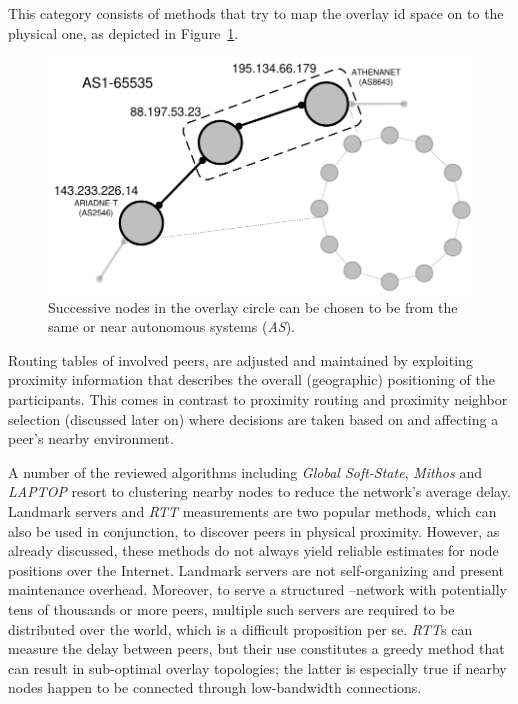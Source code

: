 This category consists of methods that try to map the overlay id space on to
the physical one, as depicted in Figure~\ref{figure:geographic-layout}.
\begin{figure}[ht]
\centering
  \includegraphics[scale=0.44]{img/pdf/geographic-layout.pdf}
\caption{Successive nodes in the overlay circle can be chosen to be from the
same or near autonomous systems (\emph{AS}).}
\label{figure:geographic-layout}
\end{figure}
Routing tables of involved peers, are adjusted and maintained by exploiting
proximity information that describes the overall (geographic) positioning of
the participants. This comes in contrast to proximity routing and proximity neighbor
selection (discussed later on) where decisions are taken based on and affecting
a peer's nearby environment.

A number of the reviewed algorithms including 
\emph{Global Soft-State},
\emph{Mithos} and \emph{LAPTOP} resort to clustering nearby nodes 
to reduce the network's average delay.
Landmark servers and \emph{RTT} measurements are two popular methods, which
can also be used in conjunction, to discover peers in physical proximity.
However, as already discussed, these
methods do not always yield reliable estimates for node positions over the
Internet. 
Landmark servers are not self-organizing and present maintenance
overhead. Moreover, to serve a structured \p--network with potentially 
tens of thousands or more 
peers, multiple such servers are required to be distributed over the world, 
which is a difficult proposition per se.
\emph{RTT}s can measure the delay between peers, but their use constitutes a
greedy method that can result in sub-optimal overlay topologies;
the latter is especially true if nearby 
nodes happen to be connected through low-bandwidth connections.

